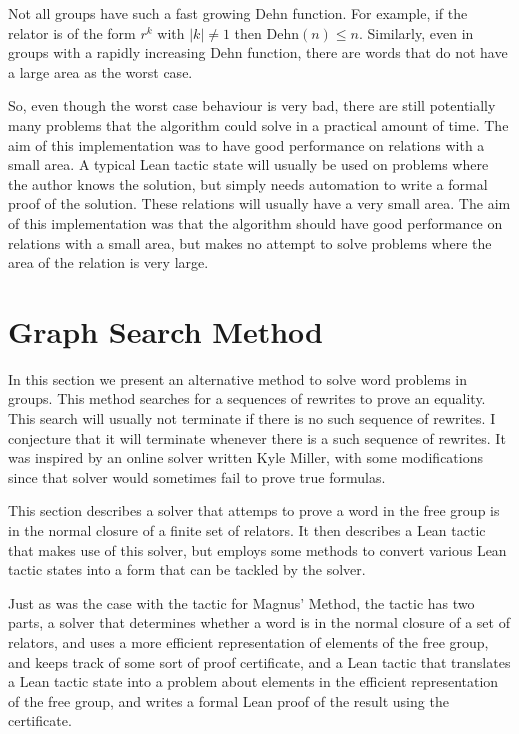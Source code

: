 \documentclass[12pt]{article} %
\theoremstyle{definition}
\theoremstyle{definition}
\theoremstyle{definition}
\theoremstyle{definition}
\theoremstyle{definition}
\theoremstyle{definition}
\begin{document}
  Not all groups have such a fast growing Dehn function. For example, if the relator
  is of the form $r^k$ with $|k| \ne 1$ then $\text{Dehn}(n) \le n$.
  Similarly, even in groups with a rapidly increasing Dehn function,
  there are words that do not have a large area as the worst case.

  So, even though the worst case behaviour is very bad, there are still potentially many
  problems that the algorithm could solve in a practical amount of time. The aim of this
  implementation was to have good performance on relations with a small area.
  A typical Lean tactic state will usually be used on problems where the author knows
  the solution, but simply needs automation to write a formal proof of the solution.
  These relations will usually have a very small area. The aim of this implementation
  was that the algorithm should have good performance on relations with a small area,
  but makes no attempt to solve problems where the area of the relation is very large.

\section{Graph Search Method}\label{gsmethod}

  In this section we present an alternative method to solve word problems in groups.
  This method searches for a sequences of rewrites to prove an equality. This search will
  usually not terminate if there is no such sequence of rewrites. I conjecture that it
  will terminate whenever there is a such sequence of rewrites. It was inspired by an
  online solver written Kyle Miller, with some modifications since that solver
  would sometimes fail to prove true formulas.

  This section describes a solver that attemps to prove a word in the free group
  is in the normal closure of a finite set of relators. It then describes
  a Lean tactic that makes use of this solver, but employs some methods
  to convert various Lean tactic states into a form that can be tackled by
  the solver.

  Just as was the case with the tactic for Magnus' Method, the tactic has two parts,
  a solver that determines whether a word is in the normal closure of a set of relators,
  and uses a more efficient representation of elements of the free group, and keeps track
  of some sort of proof certificate, and a Lean tactic that translates a Lean tactic state
  into a problem about elements in the efficient representation of the free group, and
  writes a formal Lean proof of the result using the certificate.
\end{document}
